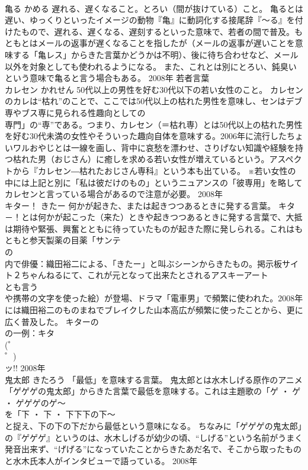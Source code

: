 \documentclass[8pt]{extreport}
\begin{document}
\begin{CJK}{UTF8}{min}
\\	亀る	かめる	遅れる、遅くなること。とろい（間が抜けている）こと。	亀るとは遅い、ゆっくりといったイメージの動物『亀』に動詞化する接尾辞『～る』を付けたもので、遅れる、遅くなる、遅刻するといった意味で、若者の間で普及。もともとはメールの返事が遅くなることを指したが（メールの返事が遅いことを意味する「亀レス」からきた言葉かどうかは不明）、後に待ち合わせなど、メール以外を対象としても使われるようになる。 また、これとは別にとろい、鈍臭いという意味で亀ると言う場合もある。	2008年	若者言葉	
\\	カレセン	かれせん	50代以上の男性を好む30代以下の若い女性のこと。	カレセンのカレは“枯れ”のことで、ここでは50代以上の枯れた男性を意味し、センはデブ専やブス専に見られる性趣向としての
\\	専門」の“専”である。つまり、カレセン（＝枯れ専）とは50代以上の枯れた男性を好む30代未満の女性やそういった趣向自体を意味する。2006年に流行したちょいワルおやじとは一線を画し、背中に哀愁を漂わせ、さりげない知識や経験を持つ枯れた男（おじさん）に癒しを求める若い女性が増えているという。アスペクトから『カレセン―枯れたおじさん専科』という本も出ている。 ※若い女性の中には上記と別に「私は彼だけのもの」というニュアンスの「彼専用」を略してカレセンと言っている場合があるので注意が必要。	2008年	
\\	キター！	きたー	何かが起きた、または起きつつあるときに発する言葉。	キタ－！とは何かが起こった（来た）ときや起きつつあるときに発する言葉で、大抵は期待や緊張、興奮とともに待っていたものが起きた際に発しられる。これはもともと参天製薬の目薬「サンテ
\\	の
\\	内で俳優：織田裕二による、「きたー」と叫ぶシーンからきたもの。掲示板サイト２ちゃんねるにて、これが元となって出来たとされるアスキーアート
\\	とも言う
\\	や携帯の文字を使った絵）が登場、ドラマ「電車男」で頻繁に使われた。2008年には織田裕二のものまねでブレイクした山本高広が頻繁に使ったことから、更に広く普及した。 キターの
\\	の一例：キタ
\\	(゜
\\	゜)
\\	ッ!!	2008年	
\\	鬼太郎	きたろう	「最低」を意味する言葉。	鬼太郎とは水木しげる原作のアニメ「ゲゲゲの鬼太郎」からきた言葉で最低を意味する。これは主題歌の「ゲ ・ ゲ ・ ゲゲゲのゲ～
\\	を「下 ・ 下 ・ 下下下の下～
\\	と捉え、下の下の下だから最低という意味になる。 ちなみに「ゲゲゲの鬼太郎」の『ゲゲゲ』というのは、水木しげるが幼少の頃、“しげる”という名前がうまく発音出来ず、“げげる”になっていたことからきたあだ名で、そこから取ったものと水木氏本人がインタビューで語っている。	2008年	

\end{CJK}
\end{document}
